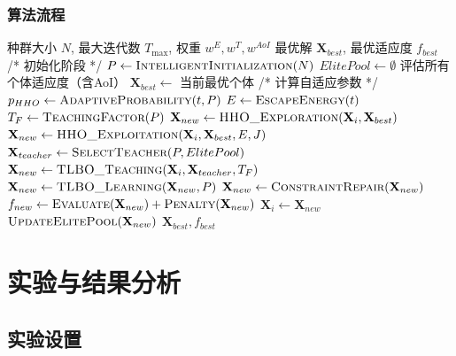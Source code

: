 \documentclass[conference]{IEEEtran}
\begin{document}
\subsubsection{算法流程}
\begin{algorithm}[H]
  \caption{TLBO-HHO双阶段集成算法（含AoI优化）}
  \label{alg:tlbo_hho_aoi}
  \begin{algorithmic}[1]
    \REQUIRE 种群大小 $N$, 最大迭代数 $T_{\max}$, 权重 $w^E, w^T, w^{AoI}$
    \ENSURE 最优解 $\mathbf{X}_{best}$, 最优适应度 $f_{best}$
    \STATE /* 初始化阶段 */
    \STATE $P \leftarrow \textsc{IntelligentInitialization}(N)$
    \STATE $ElitePool \leftarrow \emptyset$
    \STATE 评估所有个体适应度（含AoI）
    \STATE $\mathbf{X}_{best} \leftarrow$ 当前最优个体
        \STATE /* 计算自适应参数 */
        \STATE $p_{HHO} \leftarrow \textsc{AdaptiveProbability}(t, P)$
        \STATE $E \leftarrow \textsc{EscapeEnergy}(t)$
        \STATE $T_F \leftarrow \textsc{TeachingFactor}(P)$
                    \STATE $\mathbf{X}_{new} \leftarrow \textsc{HHO\_Exploration}(\mathbf{X}_i, \mathbf{X}_{best})$
                \ELSE
                    \STATE $\mathbf{X}_{new} \leftarrow \textsc{HHO\_Exploitation}(\mathbf{X}_i, \mathbf{X}_{best}, E, J)$
                \ENDIF
            \ELSE
                \STATE $\mathbf{X}_{teacher} \leftarrow \textsc{SelectTeacher}(P, ElitePool)$
                \STATE $\mathbf{X}_{new} \leftarrow \textsc{TLBO\_Teaching}(\mathbf{X}_i, \mathbf{X}_{teacher}, T_F)$
                \STATE $\mathbf{X}_{new} \leftarrow \textsc{TLBO\_Learning}(\mathbf{X}_{new}, P)$
            \ENDIF
            \STATE $\mathbf{X}_{new} \leftarrow \textsc{ConstraintRepair}(\mathbf{X}_{new})$
            \STATE $f_{new} \leftarrow \textsc{Evaluate}(\mathbf{X}_{new}) + \textsc{Penalty}(\mathbf{X}_{new})$
                \STATE $\mathbf{X}_i \leftarrow \mathbf{X}_{new}$
                \STATE $\textsc{UpdateElitePool}(\mathbf{X}_{new})$
            \ENDIF
        \ENDFOR
    \ENDFOR
    \RETURN $\mathbf{X}_{best}, f_{best}$
  \end{algorithmic}
\end{algorithm}

\section{实验与结果分析}
\subsection{实验设置}
\end{document}
